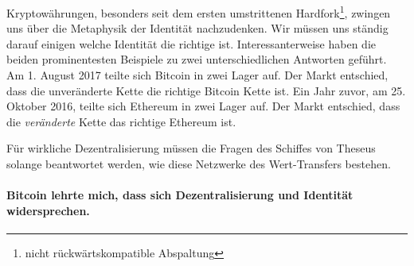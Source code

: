 Kryptowährungen, besonders seit dem ersten umstrittenen Hardfork\footnote{nicht rückwärtskompatible Abspaltung}, zwingen uns
über die Metaphysik der Identität nachzudenken. Wir müssen uns ständig darauf
einigen welche Identität die richtige ist. Interessanterweise haben die beiden
prominentesten Beispiele zu zwei  unterschiedlichen Antworten geführt. Am 1.
August 2017 teilte sich Bitcoin in zwei Lager auf. Der Markt entschied, dass die
unveränderte Kette die richtige Bitcoin Kette ist. Ein Jahr zuvor, am 25. Oktober
2016, teilte sich Ethereum in zwei Lager auf. Der Markt entschied, dass die
\textit{veränderte} Kette das richtige Ethereum ist.

Für wirkliche Dezentralisierung müssen die Fragen des Schiffes von Theseus
solange beantwortet werden, wie diese Netzwerke des Wert-Transfers bestehen.

\paragraph{Bitcoin lehrte mich, dass sich Dezentralisierung und Identität widersprechen.}

%
%
%
%
